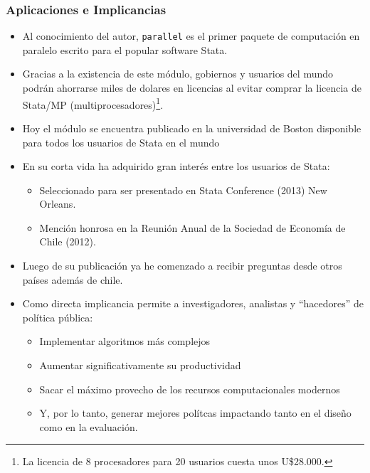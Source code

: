 \documentclass{beamer}
\begin{document}
\begin{frame}[allowframebreaks=.8]
\frametitle{Aplicaciones e Implicancias}

\begin{itemize}
\item Al conocimiento del autor, {\tt parallel} es el primer paquete de computaci\'on en paralelo escrito para el popular software Stata.
\item Gracias a la existencia de este m\'odulo, gobiernos y usuarios del mundo podr\'an ahorrarse miles de dolares en licencias al evitar comprar la licencia de Stata/MP (multiprocesadores)\footnote{La licencia de 8 procesadores para 20 usuarios cuesta unos U\$28.000.}.
\item Hoy el m\'odulo se encuentra publicado en la universidad de Boston disponible para todos los usuarios de Stata en el mundo
\item En su corta vida ha adquirido gran inter\'es entre los usuarios de Stata:
\begin{itemize}
\item Seleccionado para ser presentado en Stata Conference (2013) New Orleans.
\item Menci\'on honrosa en la Reuni\'on Anual de la Sociedad de Econom\'ia de Chile (2012).
\end{itemize}
\item Luego de su publicaci\'on ya he comenzado a recibir preguntas desde otros pa\'ises adem\'as de chile.
\item Como directa implicancia permite a investigadores, analistas y ``hacedores'' de pol\'itica p\'ublica:
\begin{itemize}
\item Implementar algoritmos m\'as complejos
\item Aumentar significativamente su productividad
\item Sacar el m\'aximo provecho de los recursos computacionales modernos
\item Y, por lo tanto, generar mejores pol\'itcas impactando tanto en el dise\~no como en la evaluaci\'on.
\end{itemize}
\end{itemize}

\end{frame}

\frame{\maketitle}
\end{document}
